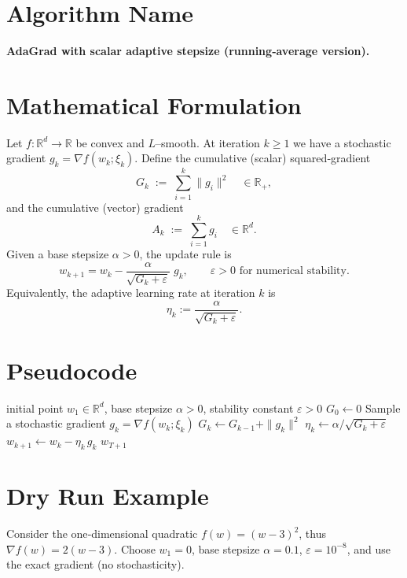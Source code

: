 \documentclass{article}
\newcommand{\R}{\mathbb{R}}
\begin{document}
\section*{Algorithm Name}
\textbf{AdaGrad with scalar adaptive stepsize (running‑average version).}

\section*{Mathematical Formulation}
Let $f:\R^d\to\R$ be convex and $L$–smooth.  
At iteration $k\ge 1$ we have a stochastic gradient $g_k=\nabla f(w_k;\xi_k)$.
Define the cumulative (scalar) squared‑gradient
\[
G_k \;:=\; \sum_{i=1}^{k}\|g_i\|^{2}\quad\in\R_{+},
\]
and the cumulative (vector) gradient
\[
A_k \;:=\; \sum_{i=1}^{k} g_i\quad\in\R^{d}.
\]
Given a base stepsize $\alpha>0$, the update rule is
\[
\boxed{
w_{k+1}=w_k-\frac{\alpha}{\sqrt{G_k+\varepsilon}}\;g_k},
\qquad\varepsilon>0\text{ for numerical stability.}
\]
Equivalently, the adaptive learning rate at iteration $k$ is
\[
\eta_k:=\frac{\alpha}{\sqrt{G_k+\varepsilon}}.
\]

\section*{Pseudocode}
\begin{algorithm}[H]
\caption{Scalar‑AdaGrad}
\begin{algorithmic}[1]
\REQUIRE initial point $w_1\in\R^d$, base stepsize $\alpha>0$, stability constant $\varepsilon>0$
\STATE $G_0 \gets 0$ 
    \STATE Sample a stochastic gradient $g_k = \nabla f(w_k;\xi_k)$
    \STATE $G_k \gets G_{k-1}+ \|g_k\|^{2}$
    \STATE $\eta_k \gets \alpha / \sqrt{G_k+\varepsilon}$
    \STATE $w_{k+1} \gets w_k - \eta_k\, g_k$
\ENDFOR
\RETURN $w_{T+1}$
\end{algorithmic}
\end{algorithm}

\section*{Dry Run Example}
Consider the one‑dimensional quadratic $f(w)=(w-3)^2$, thus $\nabla f(w)=2(w-3)$.  
Choose $w_1=0$, base stepsize $\alpha=0.1$, $\varepsilon=10^{-8}$, and use the exact gradient (no stochasticity).
\end{document}

